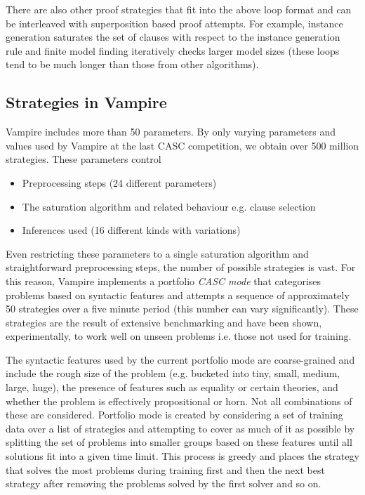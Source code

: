 \documentclass{llncs}
\begin{document}
There are also other proof strategies that fit into the above loop format 
and can be interleaved with superposition based proof attempts.
For example, instance generation \cite{instgen} saturates the set of clauses with respect to the instance generation rule and finite model finding \cite{Reger2016sat} iteratively checks larger model sizes (these loops tend to be much longer than those from other algorithms).



\subsection{Strategies in Vampire}

Vampire includes more than 50 parameters. By only varying parameters and values used by Vampire at the last CASC competition, we obtain over 500 million strategies. These parameters control
\begin{itemize}
	\item Preprocessing steps (24 different parameters)
	\item The saturation algorithm and related behaviour e.g. clause selection
	\item Inferences used (16 different kinds with variations)
\end{itemize}
Even restricting these parameters to a single saturation algorithm and straightforward preprocessing steps, the number of possible strategies is vast. For this reason, Vampire implements a portfolio \emph{CASC mode} \cite{Vampire} that categorises problems based on syntactic features and attempts a sequence of approximately 50 strategies over a five minute period (this number can vary significantly). These strategies are the result of extensive benchmarking and have been shown, experimentally, to work well on unseen problems i.e. those not used for training.

The syntactic features used by the current portfolio mode are coarse-grained and include the rough size of the problem (e.g. bucketed into tiny, small, medium, large, huge), the presence of features such as equality or certain theories, and whether the problem is effectively propositional or horn. Not all combinations of these are considered. Portfolio mode is created by considering a set of training data over a list of strategies and attempting to cover as much of it as possible by splitting the set of problems into smaller groups based on these features until all solutions fit into a given time limit. This process is greedy and places the strategy that solves the most problems during training first and then the next best strategy after removing the problems solved by the first solver and so on.
\end{document}
